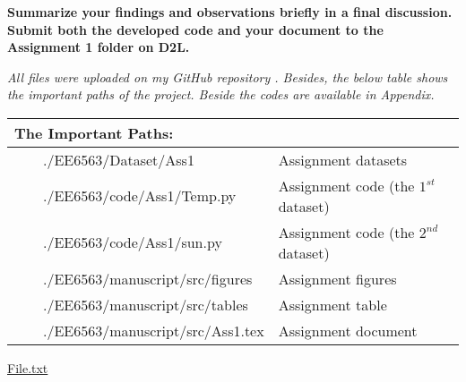 \item \textbf{Summarize your findings and observations briefly in a final discussion. Submit both the developed code and your document to the Assignment 1 folder on D2L.}

\textit{All files were uploaded on my GitHub repository \cite{SKazemii/EE6563}. Besides, the below table shows the important paths of the project. Beside the codes are available in Appendix. }

\begin{table}[H]
\centering
\begin{tabular}{|l|l|}
\hline
\multicolumn{2}{|l|}{The Important Paths:        } \\ \hline
\ \ \ \    ./EE6563/Dataset/Ass1             & Assignment datasets\\ \hline
\ \ \ \    ./EE6563/code/Ass1/Temp.py         & Assignment code (the $1^{st}$ dataset)\\ \hline
\ \ \ \    ./EE6563/code/Ass1/sun.py        & Assignment code (the $2^{nd}$ dataset)\\ \hline
\ \ \ \    ./EE6563/manuscript/src/figures   & Assignment figures\\ \hline
\ \ \ \    ./EE6563/manuscript/src/tables    & Assignment table\\ \hline
\ \ \ \    ./EE6563/manuscript/src/Ass1.tex  & Assignment document\\ \hline
\end{tabular}
\end{table}

\href{run:./EE6563/manuscript/src/Ass1.tex}{File.txt}

